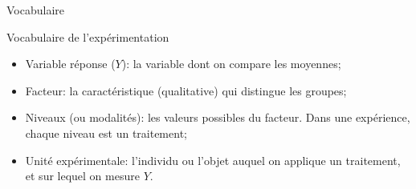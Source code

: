 \documentclass{BeamerTemplate}
\begin{document}
\begin{frame}[t]{Vocabulaire}

\begin{Boite}{Vocabulaire de l'expérimentation}
\small
\begin{itemize}
  \item \alert{Variable réponse} ($Y$): la variable dont on compare les moyennes;
  \item \alert{Facteur}: la caractéristique (qualitative) qui distingue les groupes;
  \item \alert{Niveaux} (ou modalités): les valeurs possibles du facteur.
  Dans une expérience, chaque niveau est un \alert{traitement};
  \item \alert{Unité expérimentale}: l'individu ou l'objet auquel on applique
  \alert{un} traitement, et sur lequel on mesure $Y$.
\end{itemize}
\end{Boite}

\scriptsize
{}

\end{frame}
\end{document}
